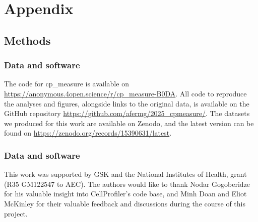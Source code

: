 \documentclass{article}
\begin{document}


\section{Appendix}
\label{sec:orgdd18dd8}
\subsection{Methods}
\label{sec:orgb3e9382}
\subsubsection{Data and software}
\label{sec:orgbda0ae2}
The code for cp\_measure is available on \url{https://anonymous.4open.science/r/cp\_measure-B0DA}. All code to reproduce the analyses and figures, alongside links to the original data, is available on the GitHub repository \url{https://github.com/afermg/2025\_cpmeasure/}. The datasets we produced for this work are available on Zenodo, and the latest version can be found on \url{https://zenodo.org/records/15390631/latest}.
\subsubsection{Data and software}
\label{sec:acknowledgements}

This work was supported by GSK and the National Institutes of Health, grant (R35 GM122547 to AEC). The authors would like to thank Nodar Gogoberidze for his valuable insight into CellProfiler's code base, and Minh Doan and Eliot McKinley for their valuable feedback and discussions during the course of this project.
\end{document}
